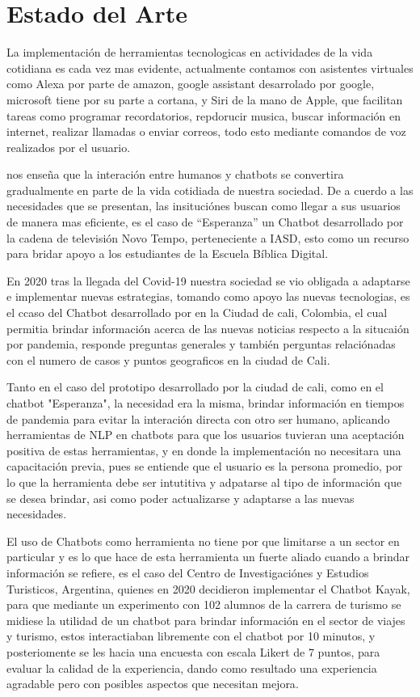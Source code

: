 \chapter{Estado del Arte}

La implementación de herramientas tecnologicas en actividades de la vida cotidiana es cada vez mas evidente, actualmente contamos con asistentes virtuales como Alexa por parte de amazon, google assistant desarrolado por google, microsoft tiene por su parte a cortana, y Siri de la mano de Apple, que facilitan tareas como programar recordatorios, repdorucir musica, buscar información en internet, realizar llamadas o enviar correos, todo esto mediante comandos de voz realizados por el usuario.

\citet{z} nos enseña que la interación entre humanos y chatbots se convertira gradualmente en parte de la vida cotidiada de nuestra sociedad. De a cuerdo a las necesidades que se presentan, las insituciónes buscan como llegar a sus usuarios de manera mas eficiente, es el caso de “Esperanza” un Chatbot desarrollado por la cadena de televisión Novo Tempo, perteneciente a
IASD, esto como un recurso para bridar apoyo a los estudiantes de la Escuela Bíblica Digital\citep{476172132004}.

En 2020 tras la llegada del Covid-19 nuestra sociedad se vio obligada a adaptarse e implementar nuevas estrategias, tomando como apoyo las nuevas tecnologias, es el ccaso del Chatbot desarrollado por en la Ciudad de cali, Colombia, el cual permitia brindar información acerca de las nuevas noticias respecto a la situcaión por pandemia, responde preguntas generales y también perguntas relaciónadas con el numero de casos y puntos geograficos en la ciudad de Cali\citep{kali}.

Tanto en el caso del prototipo desarrollado por la ciudad de cali, como en el chatbot "Esperanza", la necesidad era la misma, brindar información en tiempos de pandemia para evitar la interación directa con otro ser humano, aplicando herramientas de NLP en chatbots para que los usuarios tuvieran una aceptación positiva de estas herramientas, y en donde la implementación no necesitara una capacitación previa, pues se entiende que el usuario es la persona promedio, por lo que la herramienta debe ser intutitiva y adpatarse al tipo de información que se desea brindar, asi como poder actualizarse y adaptarse a las nuevas necesidades.

El uso de Chatbots como herramienta no tiene por que limitarse a un sector en particular y es lo que hace de esta herramienta un fuerte aliado cuando a brindar información se refiere, es el caso del Centro de Investigaciónes y Estudios Turisticos, Argentina, quienes en 2020 decidieron implementar el Chatbot Kayak, para que mediante un experimento con 102 alumnos de la carrera de turismo se midiese la utilidad de un chatbot para brindar información en el sector de viajes y turismo, estos interactiaban libremente con el chatbot por 10 minutos, y posteriomente se les hacia una encuesta con escala Likert de 7 puntos, para evaluar la calidad de la experiencia, dando como resultado una experiencia agradable pero con posibles aspectos que necesitan mejora\citep{turismo}.

